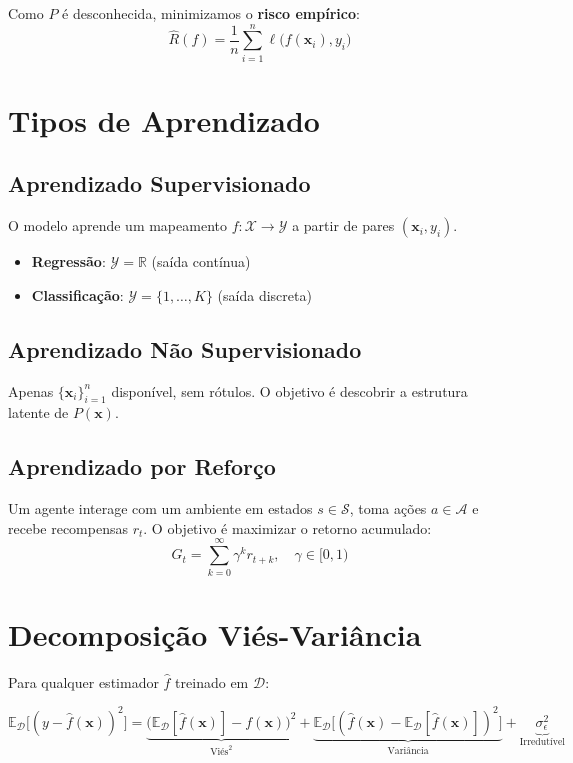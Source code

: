 \documentclass[12pt,a4paper,twoside]{book}
\theoremstyle{definition}
\theoremstyle{remark}
\newcommand{\R}{\mathbb{R}}
\newcommand{\E}{\mathbb{E}}
\newcommand{\D}{\mathcal{D}}
\newcommand{\bx}{\bm{x}}
\begin{document}
Como $P$ é desconhecida, minimizamos o \textbf{risco empírico}:
\[
\hat{R}(f) = \frac{1}{n}\sum_{i=1}^n \ell\bigl(f(\bx_i), y_i\bigr)
\]

\section{Tipos de Aprendizado}

\subsection{Aprendizado Supervisionado}

O modelo aprende um mapeamento $f: \mathcal{X} \to \mathcal{Y}$ a partir de pares $(\bx_i, y_i)$.

\begin{itemize}
  \item \textbf{Regressão}: $\mathcal{Y} = \R$ (saída contínua)
  \item \textbf{Classificação}: $\mathcal{Y} = \{1,\ldots,K\}$ (saída discreta)
\end{itemize}

\subsection{Aprendizado Não Supervisionado}

Apenas $\{\bx_i\}_{i=1}^n$ disponível, sem rótulos. O objetivo é descobrir a estrutura latente de $P(\bx)$.

\subsection{Aprendizado por Reforço}

Um agente interage com um ambiente em estados $s \in \mathcal{S}$, toma ações $a \in \mathcal{A}$ e recebe recompensas $r_t$. O objetivo é maximizar o retorno acumulado:
\[
G_t = \sum_{k=0}^{\infty} \gamma^k r_{t+k}, \quad \gamma \in [0,1)
\]

\section{Decomposição Viés-Variância}

Para qualquer estimador $\hat{f}$ treinado em $\D$:

\begin{tcolorbox}[teobox,title=Teorema da Decomposição Viés-Variância]
\[
\E_{\D}\bigl[(y - \hat{f}(\bx))^2\bigr] =
\underbrace{\bigl(\E_\D[\hat{f}(\bx)] - f(\bx)\bigr)^2}_{\text{Viés}^2}
+ \underbrace{\E_\D\bigl[(\hat{f}(\bx) - \E_\D[\hat{f}(\bx)])^2\bigr]}_{\text{Variância}}
+ \underbrace{\sigma^2_\epsilon}_{\text{Irredutível}}
\]
\end{tcolorbox}
\end{document}
